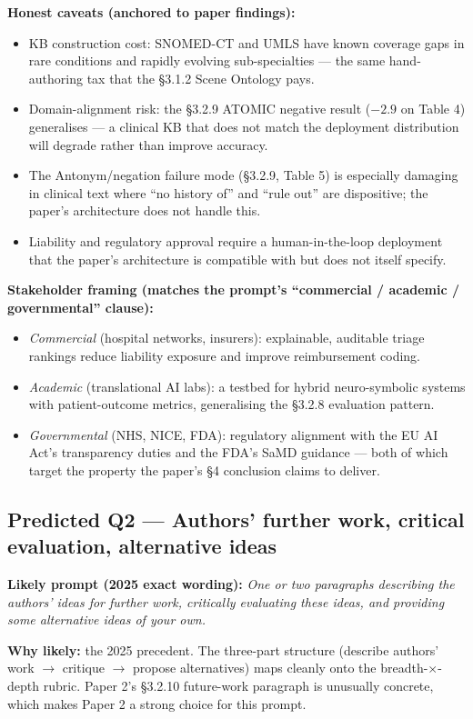 \documentclass[11pt, a4paper]{article}
\begin{document}
\textbf{Honest caveats (anchored to paper findings):}
\begin{itemize}
  \item KB construction cost: SNOMED-CT and UMLS have known coverage gaps in rare conditions and rapidly evolving sub-specialties — the same hand-authoring tax that the §3.1.2 Scene Ontology pays.
  \item Domain-alignment risk: the §3.2.9 ATOMIC negative result ($-2.9$ on Table 4) generalises — a clinical KB that does not match the deployment distribution will degrade rather than improve accuracy.
  \item The Antonym/negation failure mode (§3.2.9, Table 5) is especially damaging in clinical text where ``no history of'' and ``rule out'' are dispositive; the paper's architecture does not handle this.
  \item Liability and regulatory approval require a human-in-the-loop deployment that the paper's architecture is compatible with but does not itself specify.
\end{itemize}

\textbf{Stakeholder framing (matches the prompt's ``commercial / academic / governmental'' clause):}
\begin{itemize}
  \item \emph{Commercial} (hospital networks, insurers): explainable, auditable triage rankings reduce liability exposure and improve reimbursement coding.
  \item \emph{Academic} (translational AI labs): a testbed for hybrid neuro-symbolic systems with patient-outcome metrics, generalising the §3.2.8 evaluation pattern.
  \item \emph{Governmental} (NHS, NICE, FDA): regulatory alignment with the EU AI Act's transparency duties and the FDA's SaMD guidance — both of which target the property the paper's §4 conclusion claims to deliver.
\end{itemize}

\subsection{Predicted Q2 — Authors' further work, critical evaluation, alternative ideas}

\textbf{Likely prompt (2025 exact wording):} \emph{One or two paragraphs describing the authors' ideas for further work, critically evaluating these ideas, and providing some alternative ideas of your own.}

\textbf{Why likely:} the 2025 precedent. The three-part structure (describe authors' work \(\to\) critique \(\to\) propose alternatives) maps cleanly onto the breadth-$\times$-depth rubric. Paper 2's §3.2.10 future-work paragraph is unusually concrete, which makes Paper 2 a strong choice for this prompt.
\end{document}
